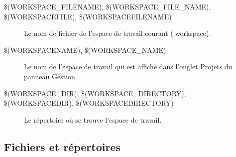 \begin{description}
\item[{\scriptsize \$(WORKSPACE\_FILENAME), \$(WORKSPACE\_FILE\_NAME), \$(WORKSPACEFILE), \$(WORKSPACEFILENAME)}] Le nom de fichier de l'espace de travail courant (.workspace).
\item[{\scriptsize \$(WORKSPACENAME), \$(WORKSPACE\_NAME)}] Le nom de l'espace de travail qui est affiché dans l'onglet Projets du panneau Gestion.
\item[{\scriptsize \$(WORKSPACE\_DIR), \$(WORKSPACE\_DIRECTORY), \$(WORKSPACEDIR), \$(WORKSPACEDIRECTORY)}] Le répertoire où se trouve l'espace de travail.
\end{description}

\subsection{Fichiers et répertoires}

